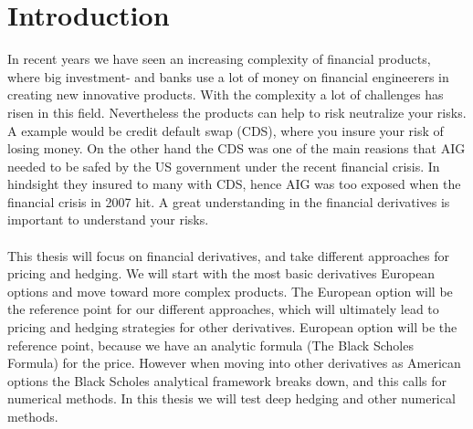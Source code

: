 
\chapter{Introduction} %

\label{Chapter1} %

In recent years we have seen an increasing complexity of financial products, where big investment- and banks use a lot of money on financial engineerers in creating new innovative products. With the complexity a lot of challenges has risen in this field. Nevertheless the products can help to risk neutralize your risks. A example would be credit default swap (CDS), where you insure your risk of losing money. On the other hand the CDS was one of the main reasions that AIG needed to be safed by the US government under the recent financial crisis. In hindsight they insured to many with CDS, hence AIG was too exposed when the financial crisis in 2007 hit. A great understanding in the financial derivatives is important to understand your risks.
\parencite{Zucchi}\\
\\
This thesis will focus on financial derivatives, and take different approaches for pricing and hedging. We will start with the most basic derivatives European options and move toward more complex products. The European option will be the reference point for our different approaches, which will ultimately lead to pricing and hedging strategies for other derivatives. European option will be the reference point, because we have an analytic formula (The Black Scholes Formula) for the price. However when moving into other derivatives as American options the Black Scholes analytical framework breaks down, and this calls for numerical methods. In this thesis we will test deep hedging and other numerical methods.